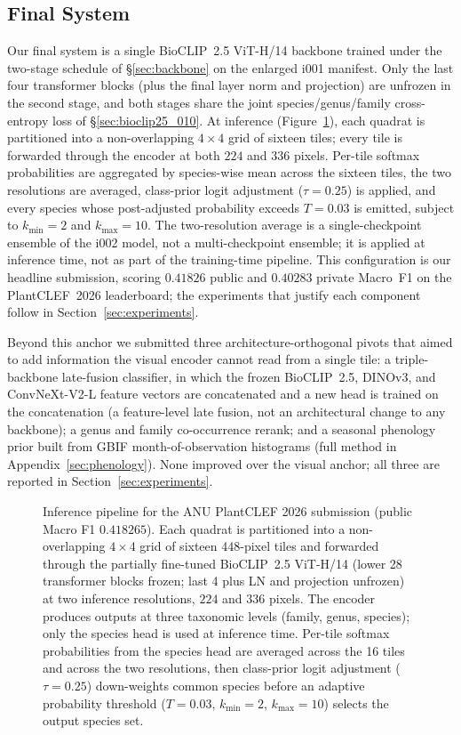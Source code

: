 \subsection{Final System}
\label{sec:final_submission}

Our final system is a single BioCLIP~2.5 ViT-H/14 backbone trained under the two-stage
schedule of \S\ref{sec:backbone} on the enlarged i001 manifest. Only the last four transformer
blocks (plus the final layer norm and projection) are unfrozen in the second stage, and both
stages share the joint species/genus/family cross-entropy loss of \S\ref{sec:bioclip25_010}. At
inference (Figure~\ref{fig:inference_pipeline}), each quadrat is
partitioned into a non-overlapping $4\times4$ grid of sixteen tiles; every tile is forwarded
through the encoder at both $224$ and $336$ pixels. Per-tile softmax probabilities are aggregated
by species-wise mean across the sixteen tiles, the two resolutions are averaged, class-prior logit
adjustment ($\tau{=}0.25$) is applied, and every species whose post-adjusted probability exceeds
$T{=}0.03$ is emitted, subject to $k_{\min}{=}2$ and $k_{\max}{=}10$. The two-resolution average is a single-checkpoint ensemble of the i002 model, not a
multi-checkpoint ensemble; it is applied at inference time, not as part of the training-time
pipeline. This configuration is our
headline submission, scoring $0.41826$ public and $0.40283$ private Macro~F1 on the PlantCLEF~2026
leaderboard; the experiments that justify each component follow in Section~\ref{sec:experiments}.

Beyond this anchor we submitted three architecture-orthogonal pivots that aimed to add information
the visual encoder cannot read from a single tile: a triple-backbone late-fusion classifier,
in which the frozen BioCLIP~2.5, DINOv3, and ConvNeXt-V2-L feature vectors are concatenated and a
new head is trained on the concatenation (a feature-level late fusion, not an architectural change
to any backbone); a genus and family co-occurrence rerank;
and a seasonal phenology prior built from GBIF month-of-observation histograms (full method in
Appendix~\ref{sec:phenology}). None improved over the visual anchor; all three are reported in
Section~\ref{sec:experiments}.

\begin{figure}[t]
  \centering
  \resizebox{\linewidth}{!}{}
  \caption{Inference pipeline for the ANU PlantCLEF 2026 submission
(public Macro F1 $0.418265$). Each quadrat is partitioned into a
non-overlapping $4{\times}4$ grid of sixteen $448$-pixel tiles and
forwarded through the partially fine-tuned BioCLIP~2.5 ViT-H/14
(lower 28 transformer blocks frozen; last 4 plus LN and projection
unfrozen) at two inference resolutions, $224$ and $336$ pixels.
The encoder produces outputs at three taxonomic levels (family,
genus, species); only the species head is used at inference time.
Per-tile softmax probabilities from the species head are averaged
across the 16 tiles and across the two resolutions, then class-prior
logit adjustment ($\tau{=}0.25$) down-weights common species before
an adaptive probability threshold ($T{=}0.03$, $k_{\min}{=}2$,
$k_{\max}{=}10$) selects the output species set.}
  \label{fig:inference_pipeline}
\end{figure}
